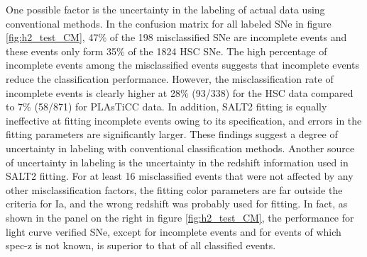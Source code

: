 \documentclass[useamsfonts]{pasj01}
\begin{document}
One possible factor is the uncertainty in the labeling of actual data using conventional methods.
In the confusion matrix for all labeled SNe in figure \ref{fig:h2_test_CM}, 47\% of the 198 misclassified SNe are incomplete events and these events only form 35\% of the 1824 HSC SNe.
The high percentage of incomplete events among the misclassified events suggests that incomplete events reduce the classification performance. %
However, the misclassification rate of incomplete events is clearly higher at 28\% (93/338) for the HSC data compared to 7\% (58/871) for PLAsTiCC data.
In addition, SALT2 fitting is equally ineffective at fitting incomplete events owing to its specification, and errors in the fitting parameters are significantly larger.
These findings suggest a degree of uncertainty in labeling with conventional classification methods.
Another source of uncertainty in labeling is the uncertainty in the redshift information used in SALT2 fitting.
For at least 16 misclassified events that were not affected by any other misclassification factors, the fitting color parameters are far outside the criteria for Ia, and the wrong redshift was probably used for fitting.
In fact, as shown in the panel on the right in figure \ref{fig:h2_test_CM}, the performance for light curve verified SNe, except for incomplete events and for events of which spec-z is not known, is superior to that of all classified events.
\end{document}
